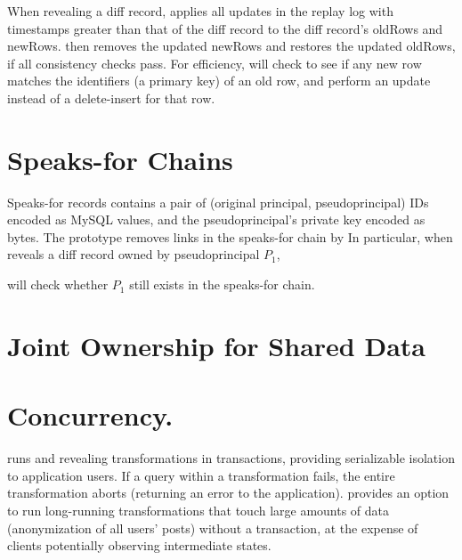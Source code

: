 %
When revealing a diff record, \sys applies all updates in the replay log with
timestamps greater than that of the diff record to the diff record's oldRows and
newRows.  \sys then removes the updated newRows and restores the updated
oldRows, if all consistency checks pass.
%
For efficiency, \sys will check to see if any new row matches the identifiers
(\eg a primary key) of an old row, and perform an update instead of a
delete-insert for that row.
%

\section{Speaks-for Chains}

Speaks-for records contains a pair of (original principal, pseudoprincipal) IDs
encoded as MySQL values, and the pseudoprincipal’s private key encoded as bytes. 
%
The \sys prototype removes links in the speaks-for chain by 
%
In particular, when \sys reveals a diff record owned by pseudoprincipal $P_1$, 


\sys will check whether $P_1$ still exists in the speaks-for chain.




\section{Joint Ownership for Shared Data}

%
\section{Concurrency.}
%
\sys runs \xxing and revealing transformations in transactions, providing
serializable isolation to application users.
%
If a query within a transformation fails, the entire transformation aborts
(returning an error to the application).
%
\sys provides an option to run long-running transformations that
touch large amounts of data (\eg anonymization of all users' posts) without a
transaction, at the expense of clients potentially observing intermediate
states.
%


%
%


